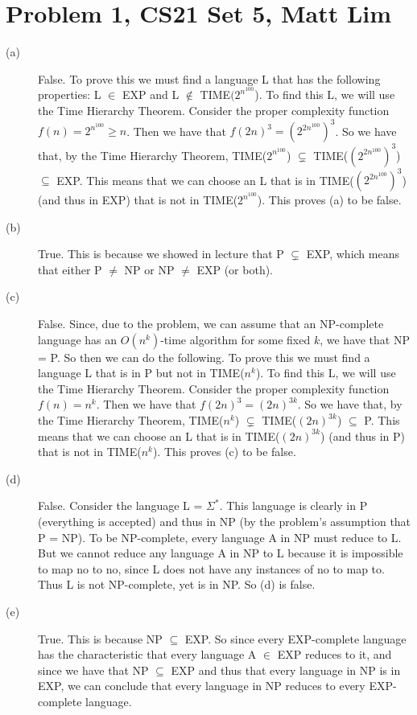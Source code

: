 \documentclass{article}
\begin{document}



\section*{Problem 1, CS21 Set 5, Matt Lim}
\begin{description}
    \item[(a)] False. To prove this we must find a language L that has the
        following properties: L $\in$ EXP and L $\notin$ TIME$(2^{n^{100}}$).
        To find this L, we will use the Time Hierarchy Theorem. Consider
        the proper complexity function $f(n) = 2^{n^{100}} \ge n$. Then we
        have that $f(2n)^{3} = (2^{2n^{100}})^{3}$. So we have that, by
        the Time Hierarchy Theorem,
        TIME($2^{n^{100}}$) $\subsetneq$ TIME($(2^{2n^{100}})^{3}$) $\subseteq$
        EXP. This means that we can choose an L that is in
        TIME($(2^{2n^{100}})^{3}$) (and thus in EXP) that is not in
        TIME($2^{n^{100}}$). This proves (a) to be false.

    \item[(b)] True. This is because we showed in lecture that P $\subsetneq$
        EXP, which means that either P $\neq$ NP or NP $\neq$ EXP (or both).
    \item[(c)] False. Since, due to the problem, we can assume that an
        NP-complete language has an $O(n^{k})$-time algorithm for some fixed
        $k$, we have that NP = P. So then we can do the following.
        To prove this we must find a language L that is in P
        but not in TIME($n^{k}$). To find this L, we will use the Time Hierarchy
        Theorem. Consider the proper complexity function $f(n) = n^{k}$. Then
        we have that $f(2n)^{3} = (2n)^{3k}$. So we have that, by the Time
        Hierarchy Theorem, TIME($n^{k}$) $\subsetneq$ TIME($(2n)^{3k}$)
        $\subseteq$ P. This means that we can choose an L that is in
        TIME($(2n)^{3k}$) (and thus in P) that is not in TIME($n^{k}$). This
        proves (c) to be false.
    \item[(d)] False. Consider the language L = $\Sigma ^{*}$. This language is
        clearly in P (everything is accepted) and thus in NP (by the problem's
        assumption that P = NP). To be NP-complete, every language A in NP
        must reduce to L. But we cannot reduce any language A in NP to L because
        it is impossible to map no to no, since L does not have any instances of
        no to map to. Thus L is not NP-complete, yet is in NP. So (d) is false.
    \item[(e)] True. This is because NP $\subseteq$ EXP. So since every
        EXP-complete language has the characteristic that every language
        A $\in$ EXP reduces to it, and since we have that NP $\subseteq$ EXP and
        thus that every language in NP is in EXP, we can conclude that every
        language in NP reduces to every EXP-complete language.
\end{description}
\end{document}
